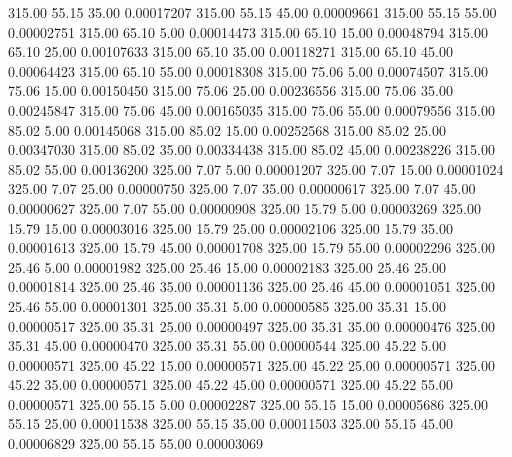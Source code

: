     315.00     55.15     35.00     0.00017207
    315.00     55.15     45.00     0.00009661
    315.00     55.15     55.00     0.00002751
    315.00     65.10      5.00     0.00014473
    315.00     65.10     15.00     0.00048794
    315.00     65.10     25.00     0.00107633
    315.00     65.10     35.00     0.00118271
    315.00     65.10     45.00     0.00064423
    315.00     65.10     55.00     0.00018308
    315.00     75.06      5.00     0.00074507
    315.00     75.06     15.00     0.00150450
    315.00     75.06     25.00     0.00236556
    315.00     75.06     35.00     0.00245847
    315.00     75.06     45.00     0.00165035
    315.00     75.06     55.00     0.00079556
    315.00     85.02      5.00     0.00145068
    315.00     85.02     15.00     0.00252568
    315.00     85.02     25.00     0.00347030
    315.00     85.02     35.00     0.00334438
    315.00     85.02     45.00     0.00238226
    315.00     85.02     55.00     0.00136200
    325.00      7.07      5.00     0.00001207
    325.00      7.07     15.00     0.00001024
    325.00      7.07     25.00     0.00000750
    325.00      7.07     35.00     0.00000617
    325.00      7.07     45.00     0.00000627
    325.00      7.07     55.00     0.00000908
    325.00     15.79      5.00     0.00003269
    325.00     15.79     15.00     0.00003016
    325.00     15.79     25.00     0.00002106
    325.00     15.79     35.00     0.00001613
    325.00     15.79     45.00     0.00001708
    325.00     15.79     55.00     0.00002296
    325.00     25.46      5.00     0.00001982
    325.00     25.46     15.00     0.00002183
    325.00     25.46     25.00     0.00001814
    325.00     25.46     35.00     0.00001136
    325.00     25.46     45.00     0.00001051
    325.00     25.46     55.00     0.00001301
    325.00     35.31      5.00     0.00000585
    325.00     35.31     15.00     0.00000517
    325.00     35.31     25.00     0.00000497
    325.00     35.31     35.00     0.00000476
    325.00     35.31     45.00     0.00000470
    325.00     35.31     55.00     0.00000544
    325.00     45.22      5.00     0.00000571
    325.00     45.22     15.00     0.00000571
    325.00     45.22     25.00     0.00000571
    325.00     45.22     35.00     0.00000571
    325.00     45.22     45.00     0.00000571
    325.00     45.22     55.00     0.00000571
    325.00     55.15      5.00     0.00002287
    325.00     55.15     15.00     0.00005686
    325.00     55.15     25.00     0.00011538
    325.00     55.15     35.00     0.00011503
    325.00     55.15     45.00     0.00006829
    325.00     55.15     55.00     0.00003069

